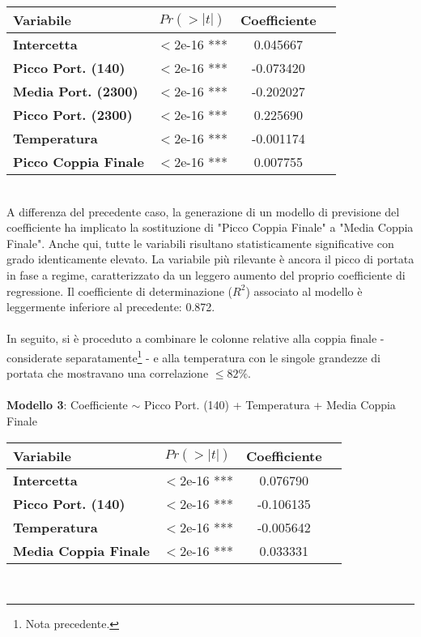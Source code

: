 \documentclass[fleqn,10pt]{SelfArx} %
\begin{document}
{\begin{table}[h] 
\centering
\begin{tabular}[t]{lccc}
\toprule 
Variabile&$Pr(> |t|)$&Coefficiente\\
\midrule 
\textbf{Intercetta}&$<$2e-16 ***&0.045667\\ 
\textbf{Picco Port. (140)}&$<$2e-16 ***&-0.073420\\ 
\textbf{Media Port. (2300)}&$<$2e-16 ***&-0.202027\\ 
\textbf{Picco Port. (2300)}&$<$2e-16 ***&0.225690\\ 
\textbf{Temperatura}&$<$2e-16 ***&-0.001174\\
\textbf{Picco Coppia Finale}&$<$2e-16 ***&0.007755\\
\bottomrule 
\end{tabular}
\end{table}}\\
A differenza del precedente caso, la generazione di un modello di previsione del coefficiente ha implicato la sostituzione di "Picco Coppia Finale" a "Media Coppia Finale". Anche qui, tutte le variabili risultano statisticamente significative con grado identicamente elevato. La variabile più rilevante è ancora il picco di portata in fase a regime, caratterizzato da un leggero aumento del proprio coefficiente di regressione. Il coefficiente di determinazione ($R^2$) associato al modello è leggermente inferiore al precedente: 0.872.\\
\\
In seguito, si è proceduto a combinare le colonne relative alla coppia finale - considerate separatamente\footnote{Nota precedente.} - e alla temperatura con le singole grandezze di portata che mostravano una correlazione $\leq 82\%$.\\
\\
\textbf{Modello 3}: Coefficiente $\sim$  Picco Port. (140) + Temperatura + Media Coppia Finale
{\begin{table}[h] 
\centering
\begin{tabular}[t]{lccc}
\toprule 
Variabile&$Pr(> |t|)$&Coefficiente\\
\midrule 
\textbf{Intercetta}&$<$2e-16 ***&0.076790\\ 
\textbf{Picco Port. (140)}&$<$2e-16 ***&-0.106135\\
\textbf{Temperatura}&$<$2e-16 ***&-0.005642\\
\textbf{Media Coppia Finale}&$<$2e-16 ***&0.033331\\
\bottomrule 
\end{tabular}
\end{table}}\\
\end{document}
